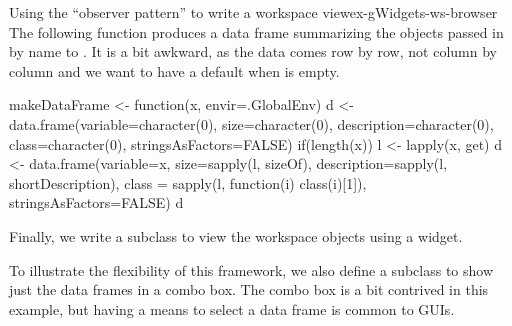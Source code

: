 \begin{example}{Using the ``observer pattern'' to write a workspace view}{ex-gWidgets-ws-browser}
The following function produces a data frame summarizing the objects passed in
by name to . It is a bit awkward, as the data comes row by
row, not column by column and we want to have a default when 
is empty.
\begin{Schunk}
\begin{Sinput}
 makeDataFrame <- function(x, envir=.GlobalEnv) {
   d <- data.frame(variable=character(0),
                   size=character(0), description=character(0), 
                   class=character(0),
                   stringsAsFactors=FALSE)
   if(length(x)) {
     l <- lapply(x, get)
     d <- data.frame(variable=x,
                     size=sapply(l, sizeOf),
                     description=sapply(l, shortDescription),
                     class = sapply(l, function(i) class(i)[1]),
                     stringsAsFactors=FALSE)
   }
   d
 }
\end{Sinput}
\end{Schunk}

%

Finally, we write a  subclass to view the workspace
objects using a  widget.
\begin{Schunk}
\end{Schunk}
%

To illustrate the flexibility of this framework, we also define a
subclass to show just the data frames in a combo box. The combo box is
a bit contrived in this example, but having a means to select a data
frame is common to \R\/ GUIs.

\begin{Schunk}
\end{Schunk}
%


\end{example}
